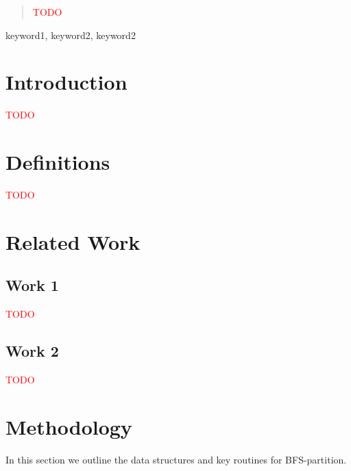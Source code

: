 \documentclass[conference]{IEEEtran}
\begin{document}
\begin{abstract}
    \textcolor{red}{TODO}
\end{abstract}

\begin{IEEEkeywords}
keyword1, keyword2, keyword2
\end{IEEEkeywords}

\section{Introduction}
\textcolor{red}{TODO}

\section{Definitions}
\textcolor{red}{TODO}

\section{Related Work}

\subsection{Work 1}

\textcolor{red}{TODO}
\cite{parmetis}

\subsection{Work 2}

\textcolor{red}{TODO}

\section{Methodology}
In this section we outline the data structures and key routines for BFS-partition.
\end{document}

